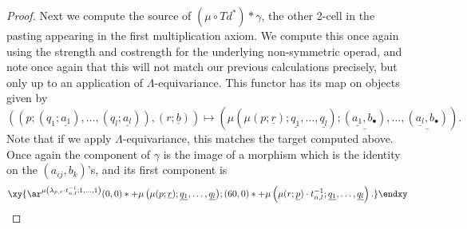 \documentclass{amsbook} %
\newcommand{\un}{\underline}
\numberwithin{section}{chapter}
\begin{document}
\begin{proof}
Next we compute the source of $(\mu \circ Td^{*})*\gamma$, the other 2-cell in the pasting appearing in the first multiplication axiom.  We compute this once again using the strength and costrength for the underlying non-symmetric operad, and note once again that this will not match our previous calculations precisely, but only up to an application of $\Lambda$-equivariance.  This functor has its map on objects given by
  \[
    \left( (p; (q_{1}; \un{a_{1}}), \ldots, (q_{l}; \un{a_{l}})), (r; \un{b}) \right) \mapsto \left(\mu(\mu(p; \un{r}); \un{q_{1}}, \ldots, \un{q_{l}}); \un{(\un{a_{1}}, b_{\bullet})}, \ldots, \un{(\un{a_{l}}, b_{\bullet})} \right).
  \]
  Note that if we apply $\Lambda$-equivariance, this matches the target computed above. Once again the component of $\gamma$ is the image of a morphism which is the identity on the $(a_{ij}, b_{k})$'s, and its first component is
  \[
    \xy
      {\ar^{\mu\left(\lambda_{p,r} \cdot t^{-1}_{n,l}; 1, \ldots, 1\right)} (0,0)*+{\mu\left(\mu(p; \un{r}); \un{q_{1}}, \ldots, \un{q_{l}}\right)}; (60,0)*+{\mu\left(\mu(r; \un{p})\cdot t^{-1}_{n,l}; \un{q_{1}}, \ldots, \un{q_{l}}\right).} }
    \endxy
  \]


\end{proof}
\end{document}
